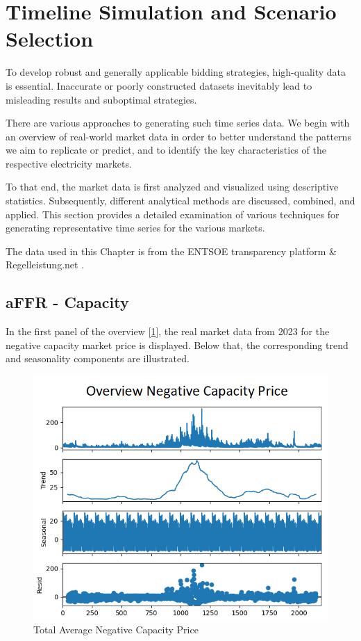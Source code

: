 \section{Timeline Simulation and Scenario Selection}
\label{chap:dataDescription}

To develop robust and generally applicable bidding strategies, high-quality data is essential.
Inaccurate or poorly constructed datasets inevitably lead to misleading results and suboptimal strategies.

There are various approaches to generating such time series data.
We begin with an overview of real-world market data in order to better understand
the patterns we aim to replicate or predict, and to identify the key characteristics
of the respective electricity markets.

To that end, the market data is first analyzed and visualized using descriptive statistics.
Subsequently, different analytical methods are discussed, combined, and applied.
This section provides a detailed examination of various techniques for generating representative time series for the  various markets.

The data used in this Chapter is from the ENTSOE transparency platform \cite{.08.04.2025} \& Regelleistung.net \cite{50HertzTransmissionGmbHAmprionGmbHTenneTTSOGmbH.18.04.2025}.

\subsection{aFFR - Capacity}

In the first panel of the overview [\ref{fig:Overview Average Negativ Capacity Price}],
the real market data from 2023 for the negative capacity market price is displayed.
Below that, the corresponding trend and seasonality components are illustrated.

\begin{figure}[!h]
	\includegraphics[width=0.7\linewidth]{pictures/capacityData_overview.png}
	\caption{Total Average Negative Capacity Price}
	\label{fig:Overview Average Negativ Capacity Price}
\end{figure}

